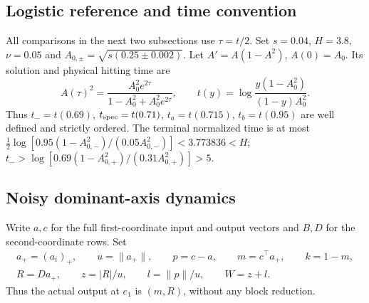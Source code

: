 \documentclass[10pt]{article}
\theoremstyle{remark}\newtheorem{remark}[theorem]{Remark}
\begin{document}
\subsection{Logistic reference and time convention}
All comparisons in the next two subsections use $\tau=t/2$.
Set $s=0.04$, $H=3.8$, $\nu=0.05$ and
$A_{0,\pm}=\sqrt{s(0.25\pm0.002)}$.
Let $A'=A(1-A^2)$, $A(0)=A_0$. Its solution and physical hitting time are
\begin{equation}\label{eq:logistic-time}
 A(\tau)^2=\frac{A_0^2e^{2\tau}}{1-A_0^2+A_0^2e^{2\tau}},
 \qquad t(y)=\log\frac{y(1-A_0^2)}{(1-y)A_0^2}.
\end{equation}
Thus $t_-=t(0.69)$, $t_{\rm spec}=t(0.71)$, $t_a=t(0.715)$,
$t_b=t(0.95)$ are well defined and strictly ordered.
The terminal normalized time is at most
$\frac12\log[0.95(1-A_{0,-}^2)/(0.05A_{0,-}^2)]<3.773836<H$;
$t_->\log[0.69(1-A_{0,+}^2)/(0.31A_{0,+}^2)]>5$.


\subsection{Noisy dominant-axis dynamics}

Write $a,c$ for the full first-coordinate input and output vectors and
$B,D$ for the second-coordinate rows. Set
\begin{gather*}
 a_+=(a_i)_+,\qquad u=\|a_+\|,\qquad p=c-a,\qquad
 m=c^\top a_+,\qquad k=1-m,\\
 R=Da_+,\qquad z=|R|/u,\qquad l=\|p\|/u,\qquad W=z+l.
\end{gather*}
Thus the actual output at $e_1$ is $(m,R)$, without any block reduction.
\end{document}
